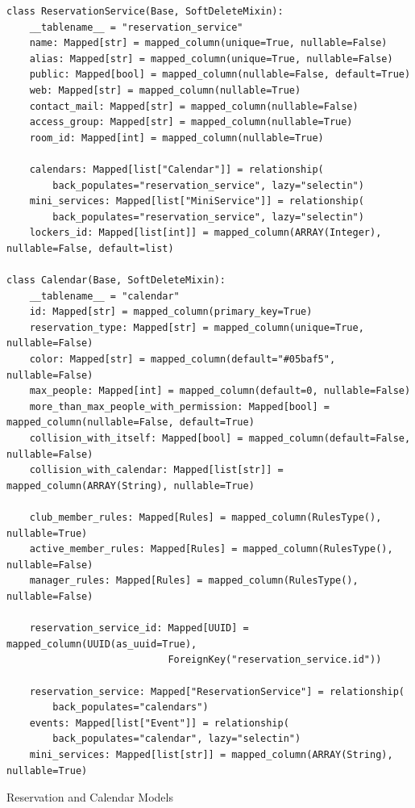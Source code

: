 \begin{listing}
  \begin{verbatim}
class ReservationService(Base, SoftDeleteMixin):
    __tablename__ = "reservation_service"
    name: Mapped[str] = mapped_column(unique=True, nullable=False)
    alias: Mapped[str] = mapped_column(unique=True, nullable=False)
    public: Mapped[bool] = mapped_column(nullable=False, default=True)
    web: Mapped[str] = mapped_column(nullable=True)
    contact_mail: Mapped[str] = mapped_column(nullable=False)
    access_group: Mapped[str] = mapped_column(nullable=True)
    room_id: Mapped[int] = mapped_column(nullable=True)

    calendars: Mapped[list["Calendar"]] = relationship(
        back_populates="reservation_service", lazy="selectin")
    mini_services: Mapped[list["MiniService"]] = relationship(
        back_populates="reservation_service", lazy="selectin")
    lockers_id: Mapped[list[int]] = mapped_column(ARRAY(Integer), nullable=False, default=list)

class Calendar(Base, SoftDeleteMixin):
    __tablename__ = "calendar"
    id: Mapped[str] = mapped_column(primary_key=True)
    reservation_type: Mapped[str] = mapped_column(unique=True, nullable=False)
    color: Mapped[str] = mapped_column(default="#05baf5", nullable=False)
    max_people: Mapped[int] = mapped_column(default=0, nullable=False)
    more_than_max_people_with_permission: Mapped[bool] = mapped_column(nullable=False, default=True)
    collision_with_itself: Mapped[bool] = mapped_column(default=False, nullable=False)
    collision_with_calendar: Mapped[list[str]] = mapped_column(ARRAY(String), nullable=True)

    club_member_rules: Mapped[Rules] = mapped_column(RulesType(), nullable=True)
    active_member_rules: Mapped[Rules] = mapped_column(RulesType(), nullable=False)
    manager_rules: Mapped[Rules] = mapped_column(RulesType(), nullable=False)

    reservation_service_id: Mapped[UUID] = mapped_column(UUID(as_uuid=True),
                            ForeignKey("reservation_service.id"))

    reservation_service: Mapped["ReservationService"] = relationship(
        back_populates="calendars")
    events: Mapped[list["Event"]] = relationship(
        back_populates="calendar", lazy="selectin")
    mini_services: Mapped[list[str]] = mapped_column(ARRAY(String), nullable=True)
\end{verbatim}
\caption{Reservation and Calendar Models}
\label{list:exp-models}
\end{listing}


